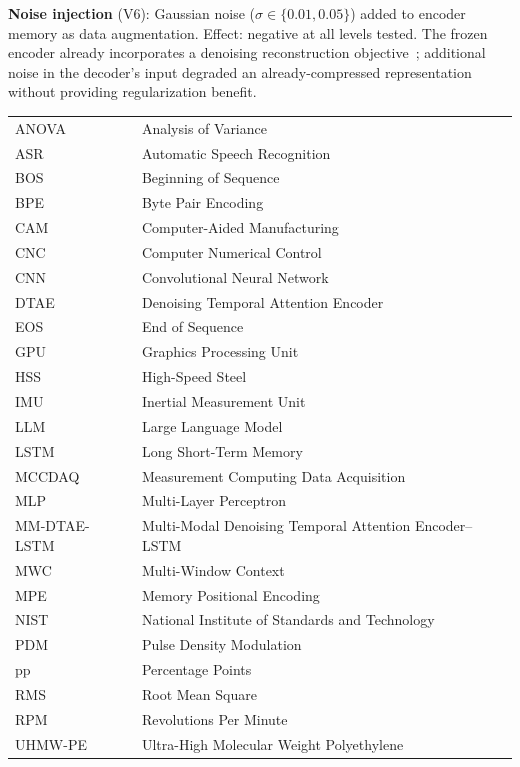 \documentclass[sensors,article,submit,moreauthors,pdftex]{Definitions/mdpi}
\begin{document}
\textbf{Noise injection} (V6): Gaussian noise ($\sigma \in \{0.01, 0.05\}$) added to encoder memory as data augmentation. Effect: negative at all levels tested. The frozen encoder already incorporates a denoising reconstruction objective~\cite{encoder_paper}; additional noise in the decoder's input degraded an already-compressed representation without providing regularization benefit.

\begin{abbreviations}
\noindent
\begin{tabular}{@{}ll}
ANOVA & Analysis of Variance \\
ASR & Automatic Speech Recognition \\
BOS & Beginning of Sequence \\
BPE & Byte Pair Encoding \\
CAM & Computer-Aided Manufacturing \\
CNC & Computer Numerical Control \\
CNN & Convolutional Neural Network \\
DTAE & Denoising Temporal Attention Encoder \\
EOS & End of Sequence \\
GPU & Graphics Processing Unit \\
HSS & High-Speed Steel \\
IMU & Inertial Measurement Unit \\
LLM & Large Language Model \\
LSTM & Long Short-Term Memory \\
MCCDAQ & Measurement Computing Data Acquisition \\
MLP & Multi-Layer Perceptron \\
MM-DTAE-LSTM & Multi-Modal Denoising Temporal Attention Encoder--LSTM \\
MWC & Multi-Window Context \\
MPE & Memory Positional Encoding \\
NIST & National Institute of Standards and Technology \\
PDM & Pulse Density Modulation \\
pp & Percentage Points \\
RMS & Root Mean Square \\
RPM & Revolutions Per Minute \\
UHMW-PE & Ultra-High Molecular Weight Polyethylene \\
\end{tabular}
\end{abbreviations}



\end{document}
